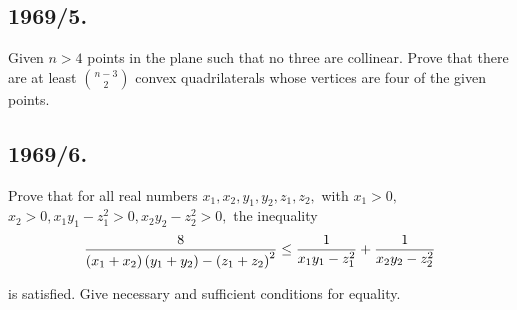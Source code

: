 \documentclass[12pt,thmsa]{article}
\begin{document}
\subsection{1969/5.}

\vspace{1pt}Given $n>4$ points in the plane such that no three are
collinear. Prove that there are at least $\binom{n-3}{2}$ convex
quadrilaterals whose vertices are four of the given points.

\subsection{1969/6.}

Prove that for all real numbers $x_{1},x_{2},y_{1},y_{2},z_{1},z_{2},$ with $%
x_{1}>0,$ $x_{2}>0,x_{1}y_{1}-z_{1}^{2}>0,x_{2}y_{2}-z_{2}^{2}>0,$ the
inequality
\[
\frac{8}{\left( x_{1}+x_{2}\right) \left( y_{1}+y_{2}\right) -\left(
z_{1}+z_{2}\right) ^{2}}\leq \frac{1}{x_{1}y_{1}-z_{1}^{2}}+\frac{1}{%
x_{2}y_{2}-z_{2}^{2}}
\]

is satisfied. Give necessary and sufficient conditions for equality.
\end{document}
